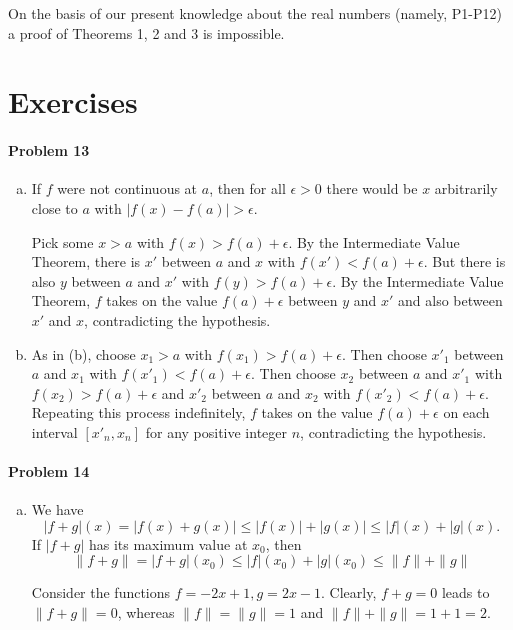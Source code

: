 \documentclass{article}
\begin{document}
On the basis of our present knowledge about the real numbers (namely, P1-P12)
a proof of Theorems 1, 2 and 3 is impossible.

\section*{Exercises}

\paragraph{Problem 13}
\begin{enumerate}[(b)]
  \item If $f$ were not continuous at $a$, then for all $\epsilon > 0$ there
    would be $x$ arbitrarily close to $a$ with $|f(x) - f(a)| > \epsilon$.

    Pick some $x > a$ with $f(x) > f(a) + \epsilon$. By the Intermediate Value
    Theorem, there is $x'$ between $a$ and $x$ with $f(x') < f(a) + \epsilon$.
    But there is also $y$ between $a$ and $x'$ with $f(y) > f(a) + \epsilon$.
    By the Intermediate Value Theorem, $f$ takes on the value $f(a) + \epsilon$
    between $y$ and $x'$ and also between $x'$ and $x$, contradicting the
    hypothesis.
  \item As in (b), choose $x_1 > a$ with $f(x_1) > f(a) + \epsilon$. Then
    choose $x'_1$ between $a$ and $x_1$ with $f(x'_1) < f(a) + \epsilon$. Then
    choose $x_2$ between $a$ and $x'_1$ with $f(x_2) > f(a) + \epsilon$ and
    $x'_2$ between $a$ and $x_2$ with $f(x'_2) < f(a) + \epsilon$. Repeating
    this process indefinitely, $f$ takes on the value $f(a) + \epsilon$ on each
    interval $[x'_n, x_n]$ for any positive integer $n$, contradicting the
    hypothesis.
\end{enumerate}

\paragraph{Problem 14}
\begin{enumerate}[(b)]
  \item We have \[
      |f + g|(x) = |f(x) + g(x)| \leq |f(x)| + |g(x)| \leq |f|(x) + |g|(x).
  \] If $|f + g|$ has its maximum value at $x_0$, then \[
    \|f + g\| = |f + g|(x_0) \leq |f|(x_0) + |g|(x_0) \leq \|f\| + \|g\|
  \]

  Consider the functions $f = -2x + 1, g = 2x - 1$. Clearly, $f + g = 0$ leads
  to $\|f + g\| = 0$, whereas $\|f\| = \|g\| = 1$ and $\|f\| + \|g\| = 1 + 1 =
  2$.
\end{enumerate}
\end{document}
